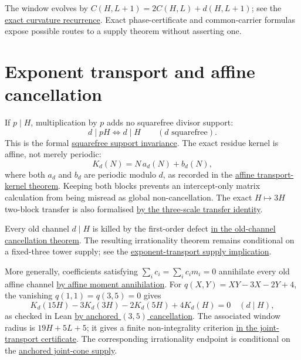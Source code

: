 \documentclass[11pt]{article}
\newcommand{\commit}{c24e2c2a781aa4a104d10884bacae52ef35cff30}
\newcommand{\repobase}{https://github.com/wcook04/plectis-lean-erdos249-257/blob/\commit}
\newcommand{\PK}{Erdos249257}
\newcommand{\lword}[4]{\href{\repobase/\PK/#1\#L#2}{#4}}
\theoremstyle{remark}\newtheorem*{remark}{Remark}
\begin{document}
The window evolves by
$C(H,L+1)=2C(H,L)+d(H,L+1)$; see the
\lword{CurvatureCarry.lean}{259}{curvatureWindow_succ}{exact curvature recurrence}.
Exact phase-certificate and common-carrier formulas expose possible routes to
a supply theorem without asserting one.

\section{Exponent transport and affine cancellation}\label{sec:transport}
If $p\mid H$, multiplication by $p$ adds no squarefree divisor support:
\[
 d\mid pH\Longleftrightarrow d\mid H\qquad(d\text{ squarefree}).
\]
This is the formal
\lword{ExponentOnlyTransport.lean}{36}{squarefree_dvd_mul_iff_of_dvd}{squarefree support invariance}.
The exact residue kernel is affine, not merely periodic:
\[
 K_d(N)=N\,a_d(N)+b_d(N),
\]
where both $a_d$ and $b_d$ are periodic modulo $d$, as recorded in the
\lword{ExponentOnlyTransport.lean}{141}{transportResidueKernel_eq_affineState}{affine transport-kernel theorem}.
Keeping both blocks prevents an intercept-only matrix calculation from being
misread as global non-cancellation. The exact $H\mapsto3H$ two-block transfer
is also formalised
\lword{ExponentOnlyTransport.lean}{176}{residueTransportDefect_three_eq_affineState}{by the three-scale transfer identity}.

Every old channel $d\mid H$ is killed by the first-order defect
\lword{ExponentOnlyTransport.lean}{112}{residueTransportDefect_eq_zero_of_dvd}{in the old-channel cancellation theorem}.
The resulting irrationality theorem remains conditional on a fixed-three
tower supply; see the
\lword{ExponentOnlyTransport.lean}{205}{irrational_totient_series_of_exponentOnlyThreeTransportSupply}{exponent-transport supply implication}.

More generally, coefficients satisfying $\sum_i c_i=\sum_i c_im_i=0$
annihilate every old affine channel
\lword{JointExponentTransport.lean}{36}{oldChannel_affine_moment_annihilation}{by affine moment annihilation}.
For $q(X,Y)=XY-3X-2Y+4$, the vanishing $q(1,1)=q(3,5)=0$ gives
\[
 K_d(15H)-3K_d(3H)-2K_d(5H)+4K_d(H)=0\quad(d\mid H),
\]
as checked in Lean
\lword{JointExponentTransport.lean}{71}{joint35_oldChannel_zero}{by anchored \((3,5)\) cancellation}.
The associated window radius is $19H+5L+5$; it gives a finite
non-integrality criterion
\lword{JointExponentTransport.lean}{172}{joint35Cone_notMem_int_of_cert}{in the joint-transport certificate}.
The corresponding irrationality endpoint is conditional on the
\lword{JointExponentTransport.lean}{217}{irrational_totient_series_of_anchoredJoint35ConeSupply}{anchored joint-cone supply}.
\end{document}
